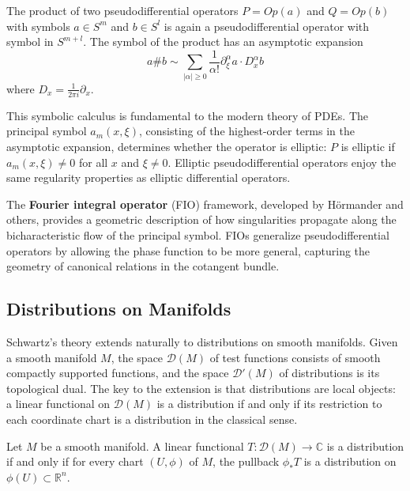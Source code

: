 \begin{theorem}
The product of two pseudodifferential operators $P = Op(a)$ and $Q = Op(b)$ with symbols $a \in S^m$ and $b \in S^l$ is again a pseudodifferential operator with symbol in $S^{m+l}$. The symbol of the product has an asymptotic expansion
\[a \# b \sim \sum_{|\alpha| \geq 0} \frac{1}{\alpha!} \partial_\xi^\alpha a \cdot D_x^\alpha b\]
where $D_x = \frac{1}{2\pi i} \partial_x$.
\end{theorem}

This symbolic calculus is fundamental to the modern theory of PDEs. The principal symbol $a_m(x,\xi)$, consisting of the highest-order terms in the asymptotic expansion, determines whether the operator is elliptic: $P$ is elliptic if $a_m(x,\xi) \neq 0$ for all $x$ and $\xi \neq 0$. Elliptic pseudodifferential operators enjoy the same regularity properties as elliptic differential operators.

The \textbf{Fourier integral operator} (FIO) framework, developed by H\"ormander and others, provides a geometric description of how singularities propagate along the bicharacteristic flow of the principal symbol. FIOs generalize pseudodifferential operators by allowing the phase function to be more general, capturing the geometry of canonical relations in the cotangent bundle.

\subsection*{Distributions on Manifolds}

Schwartz's theory extends naturally to distributions on smooth manifolds. Given a smooth manifold $M$, the space $\mathcal{D}(M)$ of test functions consists of smooth compactly supported functions, and the space $\mathcal{D}'(M)$ of distributions is its topological dual. The key to the extension is that distributions are local objects: a linear functional on $\mathcal{D}(M)$ is a distribution if and only if its restriction to each coordinate chart is a distribution in the classical sense.

\begin{theorem}
Let $M$ be a smooth manifold. A linear functional $T: \mathcal{D}(M) \to \mathbb{C}$ is a distribution if and only if for every chart $(U, \phi)$ of $M$, the pullback $\phi_* T$ is a distribution on $\phi(U) \subset \mathbb{R}^n$.
\end{theorem}

